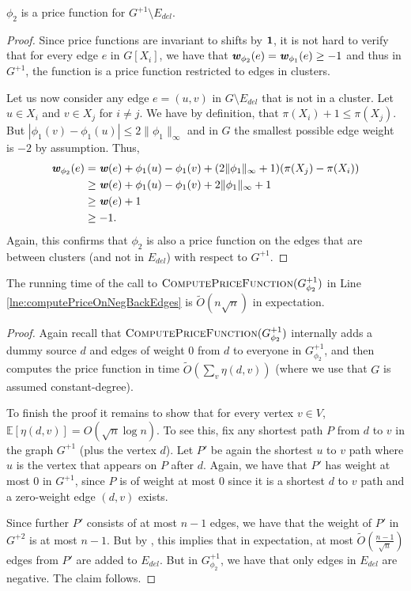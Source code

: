 \begin{claim}
$\phi_2$ is a price function for $G^{+1} \setminus E_{del}$. 
\end{claim}
\begin{proof}
Since price functions are invariant to shifts by $\boldsymbol{1}$, it is not hard to verify that for every edge $e$ in $G[X_i]$, we have that $\boldsymbol{\mathit{w}}_{\phi_2}(e)  = \boldsymbol{\mathit{w}}_{\phi_1}(e) \geq -1$ and thus in $G^{+1}$, the function is a price function restricted to edges in clusters.

Let us now consider any edge $e = (u,v)$ in $G \setminus E_{del}$ that is not in a cluster. Let $u \in X_i$ and $v \in X_j$ for $i \neq j$. We have by definition, that $\pi(X_i) + 1 \leq \pi(X_j)$. But $|\phi_1(v) - \phi_1(u)| \leq 2\|\phi_1 \|_{\infty}$ and in $G$ the smallest possible edge weight is $-2$ by assumption. Thus, 
\begin{align*}
\boldsymbol{\mathit{w}}_{\phi_2}(e) &= \boldsymbol{\mathit{w}}(e) + \phi_1(u) - \phi_1(v) + (2\|\phi_1 \|_{\infty} + 1) (\pi(X_j) - \pi(X_i)) \\
& \geq \boldsymbol{\mathit{w}}(e) + \phi_1(u) - \phi_1(v) + 2\|\phi_1 \|_{\infty} + 1\\
& \geq \boldsymbol{\mathit{w}}(e) +1 \\
&\geq -1.
\end{align*} 
Again, this confirms that $\phi_2$ is also a price function on the edges that are between clusters (and not in $E_{del}$) with respect to $G^{+1}$.
\end{proof}

\begin{claim}\label{clm:finalClaimNegSSSP}
The running time  of the call to $ \textsc{ComputePriceFunction}(G^{+1}_{\phi_2})$ in Line \ref{lne:computePriceOnNegBackEdges} is $\tilde{O}(n \sqrt{n})$ in expectation.
\end{claim}
\begin{proof}
Again recall that  $\textsc{ComputePriceFunction}(G^{+1}_{\phi_2})$ internally adds a dummy source $d$ and edges of weight $0$ from $d$ to everyone in $G^{+1}_{\phi_2}$, and then computes the price function in time $\tilde{O}(\sum_v \eta(d,v))$ (where we use that $G$ is assumed constant-degree).

To finish the proof it remains to show that for every vertex $v \in V$, $\mathbb{E}[\eta(d,v)] = O( \sqrt{n} \log n)$. To see this, fix any shortest path $P$ from $d$ to $v$ in the graph $G^{+1}$ (plus the vertex $d$). Let $P'$ be again the shortest $u$ to $v$ path where $u$ is the vertex that appears on $P$ after $d$. Again, we have that $P'$ has weight at most $0$ in $G^{+1}$, since $P$ is of weight at most $0$ since it is a shortest $d$ to $v$ path and a zero-weight edge $(d,v)$ exists. 

Since further $P'$ consists of at most $n-1$ edges, we have that the weight of $P'$ in $G^{+2}$ is at most $n-1$. But by , this implies that in expectation, at most $\tilde{O}(\frac{n-1}{\sqrt{n}})$ edges from $P'$ are added to $E_{del}$. But in $G^{+1}_{\phi_2}$, we have that only edges in $E_{del}$ are negative. The claim follows.
\end{proof}

